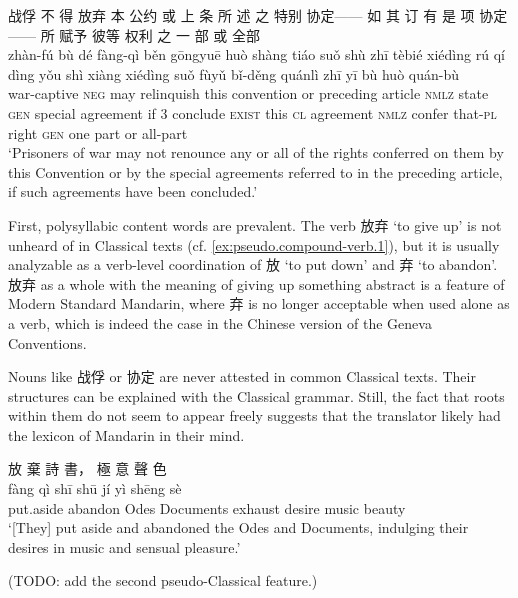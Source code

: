 \documentclass[UTF8, a4paper, oneside, scheme=plain, 12pt]{ctexrep}
\newcommand{\translate}[1]{`#1'}
\newcommand*{\category}[1]{\textsc{#1}}
\begin{document}
\begin{exe}
    \ex\label{ex:pseudo.text.1}
    \glll 战俘 不 得 放弃 本 公约 或 上 条 所 述 之 特别 协定—— 如 其 订 有 是 项 协定—— 所 赋予 彼等 权利 之 一 部 或 全部 \\
    zhàn-fú bù dé fàng-qì běn gōngyuē huò shàng tiáo suǒ shù zhī tèbié xiédìng rú qí dìng yǒu shì xiàng xiédìng suǒ fùyǔ bǐ-děng quánlì zhī yī bù huò quán-bù \\
    war-captive \category{neg} may relinquish this convention or preceding article \category{nmlz} state \category{gen} special agreement if 3 conclude \category{exist} this \category{cl} agreement \category{nmlz} confer that-\category{pl} right \category{gen} one part or all-part \\
    \glt\translate{Prisoners of war may not renounce any or all of the rights conferred on them by this Convention or by the special agreements referred to in the preceding article, if such agreements have been concluded.}
\end{exe}

First, polysyllabic content words are prevalent.
The verb 放弃 \translate{to give up} is not unheard of in Classical texts (cf. \ref{ex:pseudo.compound-verb.1}),
but it is usually analyzable as a verb-level coordination of 放 \translate{to put down} and 弃 \translate{to abandon}.
放弃 as a whole with the meaning of giving up something abstract is a feature of Modern Standard Mandarin,
where 弃 is no longer acceptable when used alone as a verb,
which is indeed the case in the Chinese version of the Geneva Conventions.

Nouns like 战俘 or 协定 are never attested in common Classical texts.
Their structures can be explained with the Classical grammar.
Still, the fact that roots within them do not seem to appear freely suggests that the translator likely had the lexicon of Mandarin in their mind.

\begin{exe}
    \ex\label{ex:pseudo.compound-verb.1}
    \glll 放 棄 詩 書， 極 意 聲 色 \\
    fàng qì shī shū jí yì shēng sè \\
    put.aside abandon Odes Documents exhaust desire music beauty \\
    \glt\translate{[They] put aside and abandoned the Odes and Documents, indulging their desires in music and sensual pleasure.}
\end{exe}

(TODO: add the second pseudo-Classical feature.)
\end{document}
